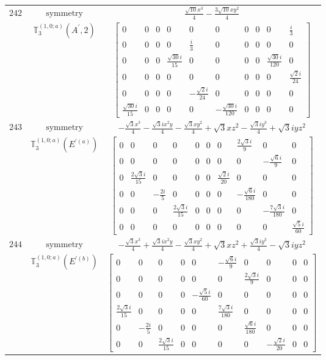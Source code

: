 \documentclass[fleqn,8pt,landscape]{jsarticle}
\begin{document}
\begin{longtable}{ccc}
$ 242 $ & $ \text{symmetry} $ & $ \frac{\sqrt{10} x^{3}}{4} - \frac{3 \sqrt{10} x y^{2}}{4} $ \\
$  $ & $ \mathbb{T}_{3}^{(1,0;a)}(A^{\prime},2) $ & $ \begin{bmatrix} 0 & 0 & 0 & 0 & 0 & 0 & 0 & 0 & 0 & \frac{i}{3} \\ 0 & 0 & 0 & 0 & \frac{i}{3} & 0 & 0 & 0 & 0 & 0 \\ 0 & 0 & 0 & \frac{\sqrt{30} i}{15} & 0 & 0 & 0 & 0 & \frac{\sqrt{30} i}{120} & 0 \\ 0 & 0 & 0 & 0 & 0 & 0 & 0 & 0 & 0 & \frac{\sqrt{2} i}{24} \\ 0 & 0 & 0 & 0 & - \frac{\sqrt{2} i}{24} & 0 & 0 & 0 & 0 & 0 \\ \frac{\sqrt{30} i}{15} & 0 & 0 & 0 & 0 & - \frac{\sqrt{30} i}{120} & 0 & 0 & 0 & 0 \end{bmatrix} $ \\ \hline
$ 243 $ & $ \text{symmetry} $ & $ - \frac{\sqrt{3} x^{3}}{4} - \frac{\sqrt{3} i x^{2} y}{4} - \frac{\sqrt{3} x y^{2}}{4} + \sqrt{3} x z^{2} - \frac{\sqrt{3} i y^{3}}{4} + \sqrt{3} i y z^{2} $ \\
$  $ & $ \mathbb{T}_{3}^{(1,0;a)}(E^{\prime(a)}) $ & $ \begin{bmatrix} 0 & 0 & 0 & 0 & 0 & 0 & 0 & \frac{2 \sqrt{3} i}{9} & 0 & 0 \\ 0 & 0 & 0 & 0 & 0 & 0 & 0 & 0 & - \frac{\sqrt{6} i}{9} & 0 \\ 0 & \frac{2 \sqrt{3} i}{15} & 0 & 0 & 0 & 0 & \frac{\sqrt{2} i}{20} & 0 & 0 & 0 \\ 0 & 0 & - \frac{2 i}{5} & 0 & 0 & 0 & 0 & - \frac{\sqrt{6} i}{180} & 0 & 0 \\ 0 & 0 & 0 & \frac{2 \sqrt{3} i}{15} & 0 & 0 & 0 & 0 & - \frac{7 \sqrt{3} i}{180} & 0 \\ 0 & 0 & 0 & 0 & 0 & 0 & 0 & 0 & 0 & \frac{\sqrt{5} i}{60} \end{bmatrix} $ \\ \hline
$ 244 $ & $ \text{symmetry} $ & $ - \frac{\sqrt{3} x^{3}}{4} + \frac{\sqrt{3} i x^{2} y}{4} - \frac{\sqrt{3} x y^{2}}{4} + \sqrt{3} x z^{2} + \frac{\sqrt{3} i y^{3}}{4} - \sqrt{3} i y z^{2} $ \\
$  $ & $ \mathbb{T}_{3}^{(1,0;a)}(E^{\prime(b)}) $ & $ \begin{bmatrix} 0 & 0 & 0 & 0 & 0 & - \frac{\sqrt{6} i}{9} & 0 & 0 & 0 & 0 \\ 0 & 0 & 0 & 0 & 0 & 0 & \frac{2 \sqrt{3} i}{9} & 0 & 0 & 0 \\ 0 & 0 & 0 & 0 & - \frac{\sqrt{5} i}{60} & 0 & 0 & 0 & 0 & 0 \\ \frac{2 \sqrt{3} i}{15} & 0 & 0 & 0 & 0 & \frac{7 \sqrt{3} i}{180} & 0 & 0 & 0 & 0 \\ 0 & - \frac{2 i}{5} & 0 & 0 & 0 & 0 & \frac{\sqrt{6} i}{180} & 0 & 0 & 0 \\ 0 & 0 & \frac{2 \sqrt{3} i}{15} & 0 & 0 & 0 & 0 & - \frac{\sqrt{2} i}{20} & 0 & 0 \end{bmatrix} $ \\ \hline

\end{longtable}
\end{document}
